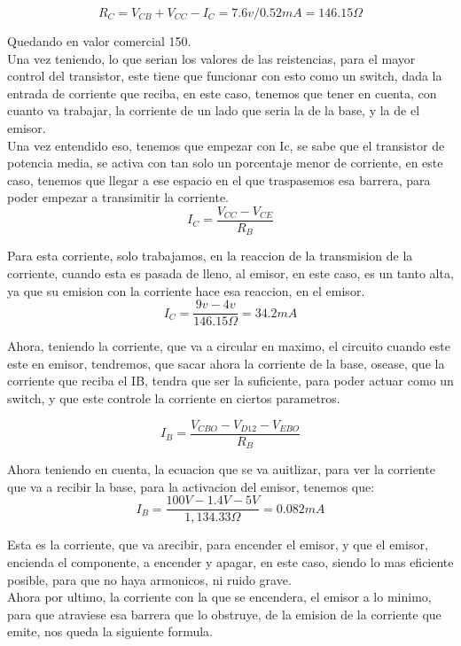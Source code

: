 \documentclass[12pt,a4paper]{article}
\begin{document}
$$ R_{C}=V_{CB}+V_{CC}-I_{C}=7.6v/0.52mA= 146.15\Omega $$

Quedando en valor comercial 150\Omega.\\

Una vez teniendo, lo que serian los valores de las reistencias, para el mayor control del transistor, este tiene que funcionar con esto como un switch, dada la entrada de corriente que reciba, en este caso, tenemos que tener en cuenta, con cuanto va trabajar, la corriente de un lado que seria la de la base, y la de el emisor.\\

Una vez entendido eso, tenemos que empezar con Ic, se sabe que el transistor de potencia media, se activa con tan solo un porcentaje menor de corriente, en este caso, tenemos que llegar a ese espacio en el que traspasemos esa barrera, para poder empezar a transimitir la corriente.\\

$$ I_{C}=\frac{V_{CC}-V_{CE}}{R_{B}} $$

Para esta corriente, solo trabajamos, en la reaccion de la transmision de la corriente, cuando esta es pasada de lleno, al emisor, en este caso, es un tanto alta, ya que su emision con la corriente hace esa reaccion, en el emisor.\\

$$ I_{C}=\frac{9v-4v}{146.15\Omega}= 34.2mA $$

Ahora, teniendo la corriente, que va a circular en maximo, el circuito cuando este este en emisor, tendremos, que sacar ahora la corriente de la base, osease, que la corriente que reciba el IB, tendra que ser la suficiente, para poder actuar como un switch, y que este controle la corriente en ciertos parametros.

$$ I_{B}=\frac{V_{CBO}-V_{D12}-V_{EBO}}{R_{B}} $$

Ahora teniendo en cuenta, la ecuacion que se va auitlizar, para ver la corriente que va a recibir la base, para la activacion del emisor, tenemos que:\\

$$ I_{B}=\frac{100V-1.4V-5V}{1,134.33\Omega}= 0.082mA $$

Esta es la corriente, que va arecibir, para encender el emisor, y que el emisor, encienda el componente, a encender y apagar, en este caso, siendo lo mas eficiente posible, para que no haya armonicos, ni ruido grave.\\

Ahora por ultimo, la corriente con la que se encendera, el emisor a lo minimo, para que atraviese esa barrera que lo obstruye, de la emision de la corriente que emite, nos queda la siguiente formula.\\
\end{document}
